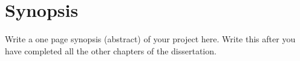 
\chapter*{Synopsis}

Write a one page synopsis (abstract) of your project here. Write this
after you have completed all the other chapters of the dissertation.
